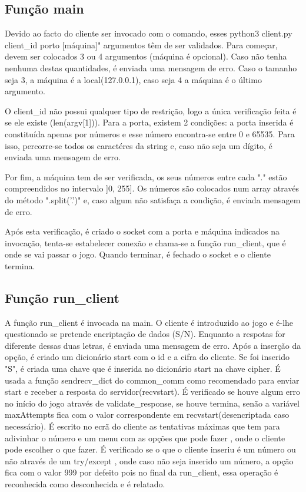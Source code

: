 \documentclass{report}
\begin{document}
\subsection{Função main}
\label{ssec:main}
Devido ao facto do cliente ser invocado com o comando, esses python3 client.py client\_id porto [máquina]"
argumentos têm de ser validados. Para começar, devem ser colocados 3 ou 4 argumentos (máquina é opcional).
Caso não tenha nenhuma destas quantidades, é enviada uma mensagem de erro. Caso o tamanho seja 3, a máquina é
a local(127.0.0.1), caso seja 4 a máquina é o último argumento. 

O client\_id não possui qualquer tipo de restrição, 
logo a única verificação feita é se ele existe (len(argv[1])). Para a porta, existem 2 condições: a porta inserida é 
constituída apenas por números e esse número encontra-se entre 0 e 65535. Para isso, percorre-se todos os caractéres 
da string e, caso não seja um dígito, é enviada uma mensagem de erro.

Por fim, a máquina tem de ser verificada,
os seus números entre cada "." estão compreendidos no intervalo ]0, 255]. Os números são colocados num array através
do método ".split('.')" e, caso algum não satisfaça a condição, é enviada mensagem de erro.

Após esta verificação, é criado o socket com a porta e máquina indicados na invocação, tenta-se estabelecer conexão e chama-se a 
função run\_client, que é onde se vai passar o jogo. Quando terminar, é fechado o socket e o cliente termina.


\subsection{Função run\_client}

\label{ssec:runclient}
A função run\_client é invocada na main. O cliente é introduzido ao jogo e é-lhe questionado se pretende encriptação
de dados (S/N). Enquanto a respotas for diferente dessas duas letras, é enviada uma mensagem de erro. Após a inserção da
opção, é criado um dicionário start com o id e a cifra do cliente. Se foi inserido "S", é criada uma chave que é inserida
no dicionário start na chave cipher. É usada a função sendrecv\_dict do common\_comm como recomendado para enviar start
e receber a resposta do servidor(recvstart). É verificado se houve algum erro no início do jogo através de validate\_response,
se houve termina, senão a variável maxAttempts fica com o valor correspondente em recvstart(desencriptada caso necessário). É escrito no ecrã do cliente as tentativas máximas que tem para adivinhar o número e um menu com as opções que pode fazer
, onde o cliente pode escolher o que fazer. É verificado se o que o cliente inseriu é um número ou não através de um try/except
, onde caso não seja inserido um número, a opção fica com o valor 999 por defeito pois no final da run\_client, essa operação é
 reconhecida como desconhecida e é relatado. 
 
\end{document}
